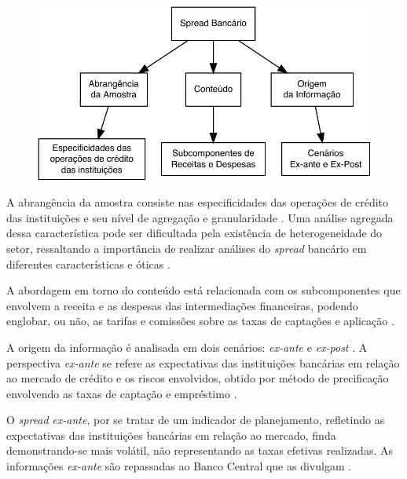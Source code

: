 \documentclass[12pt,12pt,openright,oneside,a4paper,chapter=TITLE,section=TITLE,subsection=TITLE,subsubsection=TITLE,english,french,spanish,portugues,sumario=tradicional]{abntex2}
\begin{document}
\begin{figure}

\begin{center}\includegraphics{12-exportedfigures/diagram.spread.carac-1} \end{center}
\label{fig:diagramb}
\end{figure}

A abrangência da amostra consiste nas especificidades das operações de crédito
das instituições e seu nível de agregação e granularidade
\cite{costa;nakane:2004}. Uma análise agregada dessa característica pode ser
dificultada pela existência de heterogeneidade do setor, ressaltando a
importância de realizar análises do \emph{spread} bancário em diferentes
características e óticas \cite{block:2000}.

A abordagem em torno do conteúdo está relacionada com os subcomponentes que
envolvem a receita e as despesas das intermediações financeiras, podendo
englobar, ou não, as tarifas e comissões sobre as taxas de captações e
aplicação \cite{block:2000}.

A origem da informação é analisada em dois cenários: \emph{ex-ante} e \emph{ex-post}
\cite{kunt:1999, levine:1997}. A perspectiva \emph{ex-ante} se refere as
expectativas das instituições bancárias em relação ao mercado de crédito e os
riscos envolvidos, obtido por método de precificação envolvendo as taxas de
captação e empréstimo \cite{durigan:2018, leal:2006, dantas:2012}.

O \emph{spread} \emph{ex-ante}, por se tratar de um indicador de planejamento, refletindo
as expectativas das instituições bancárias em relação ao mercado, finda
demonstrando-se mais volátil, não representando as taxas efetivas realizadas.
As informações \emph{ex-ante} são repassadas ao Banco Central que as divulgam
\cite{durigan:2018, leal:2006, dantas:2012}.
\end{document}
